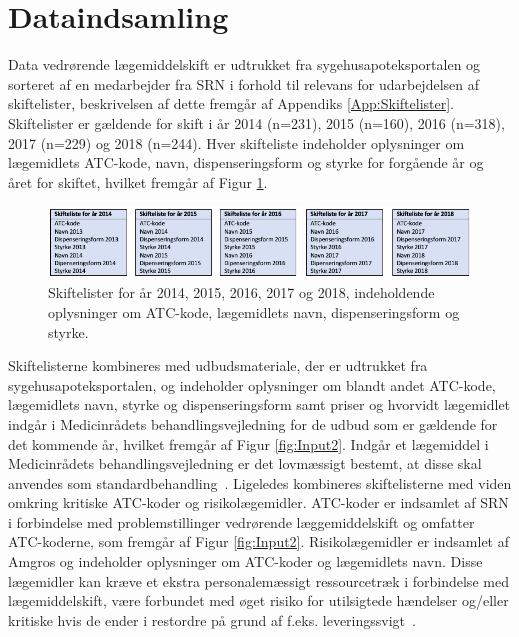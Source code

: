 \section{Dataindsamling}
Data vedrørende lægemiddelskift er udtrukket fra sygehusapoteksportalen og sorteret af en medarbejder fra SRN i forhold til relevans for udarbejdelsen af skiftelister, beskrivelsen af dette fremgår af Appendiks \ref{App:Skiftelister}. Skiftelister er gældende for skift i år 2014 (n=231), 2015 (n=160), 2016 (n=318), 2017 (n=229) og 2018 (n=244). Hver skifteliste indeholder oplysninger om lægemidlets ATC-kode, navn, dispenseringsform og styrke for forgående år og året for skiftet, hvilket fremgår af Figur \ref{fig:Input}.

\vspace{0.2cm}
\begin{figure}[H]\centering
\includegraphics[width=1\textwidth]{billeder/Input1.png} 
	\caption{Skiftelister for år 2014, 2015, 2016, 2017 og 2018, indeholdende oplysninger om ATC-kode, lægemidlets navn, dispenseringsform og styrke.}
	\label{fig:Input}  
\end{figure}

Skiftelisterne kombineres med udbudsmateriale, der er udtrukket fra sygehusapoteksportalen, og indeholder oplysninger om blandt andet ATC-kode, lægemidlets navn, styrke og dispenseringsform samt priser og hvorvidt lægemidlet indgår i Medicinrådets behandlingsvejledning for de udbud som er gældende for det kommende år, hvilket fremgår af Figur \ref{fig:Input2}.
Indgår et lægemiddel i Medicinrådets behandlingsvejledning er det lovmæssigt bestemt, at disse skal anvendes som standardbehandling~\citep{Medicinradet2018}.
Ligeledes kombineres skiftelisterne med viden omkring kritiske ATC-koder og risikolægemidler. ATC-koder er indsamlet af SRN i forbindelse med problemstillinger vedrørende læggemiddelskift og omfatter ATC-koderne, som fremgår af Figur \ref{fig:Input2}. Risikolægemidler er indsamlet af Amgros og indeholder oplysninger om ATC-koder og lægemidlets navn. Disse lægemidler kan kræve et ekstra personalemæssigt ressourcetræk i forbindelse med lægemiddelskift, være forbundet med øget risiko for utilsigtede hændelser og/eller kritiske hvis de ender i restordre på grund af f.eks. leveringssvigt~\citep{Amgros}. 


